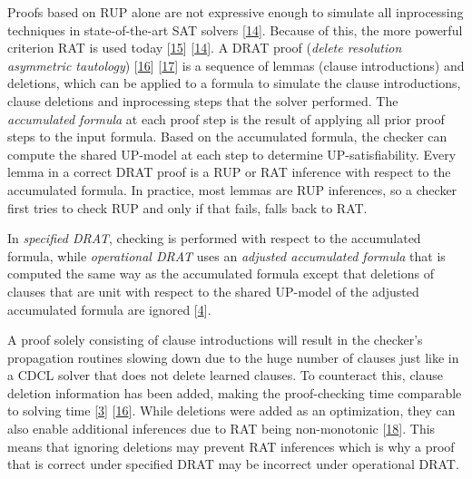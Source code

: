 \documentclass[
]{report}
\begin{document}
Proofs based on RUP alone are not expressive enough to simulate all
inprocessing techniques in state-of-the-art SAT solvers
{[}\protect\hyperlink{ref-DBLP:confux2fcadeux2fHeuleHW13}{14}{]}.
Because of this, the more powerful criterion RAT is used today
{[}\protect\hyperlink{ref-DBLP:journalsux2famaiux2fGelder12}{15}{]}
{[}\protect\hyperlink{ref-DBLP:confux2fcadeux2fHeuleHW13}{14}{]}. A DRAT
proof (\emph{delete resolution asymmetric tautology})
{[}\protect\hyperlink{ref-DBLP:confux2fsatux2fWetzlerHH14}{16}{]}
{[}\protect\hyperlink{ref-DBLP:journalsux2fcorrux2fHeule16}{17}{]} is a
sequence of lemmas (clause introductions) and deletions, which can be
applied to a formula to simulate the clause introductions, clause
deletions and inprocessing steps that the solver performed. The
\emph{accumulated formula} at each proof step is the result of applying
all prior proof steps to the input formula. Based on the accumulated
formula, the checker can compute the shared UP-model at each step to
determine UP-satisfiability. Every lemma in a correct DRAT proof is a
RUP or RAT inference with respect to the accumulated formula. In
practice, most lemmas are RUP inferences, so a checker first tries to
check RUP and only if that fails, falls back to RAT.

In \emph{specified DRAT}, checking is performed with respect to the
accumulated formula, while \emph{operational DRAT} uses an
\emph{adjusted accumulated formula} that is computed the same way as the
accumulated formula except that deletions of clauses that are unit with
respect to the shared UP-model of the adjusted accumulated formula are
ignored
{[}\protect\hyperlink{ref-DBLP:confux2fsatux2fRebola-PardoB18}{4}{]}.

A proof solely consisting of clause introductions will result in the
checker's propagation routines slowing down due to the huge number of
clauses just like in a CDCL solver that does not delete learned clauses.
To counteract this, clause deletion information has been added, making
the proof-checking time comparable to solving time
{[}\protect\hyperlink{ref-DBLP:journalsux2fstvrux2fHeuleHW14}{3}{]}
{[}\protect\hyperlink{ref-DBLP:confux2fsatux2fWetzlerHH14}{16}{]}. While
deletions were added as an optimization, they can also enable additional
inferences due to RAT being non-monotonic
{[}\protect\hyperlink{ref-DBLP:confux2flparux2fPhilippR17}{18}{]}. This
means that ignoring deletions may prevent RAT inferences which is why a
proof that is correct under specified DRAT may be incorrect under
operational DRAT.
\end{document}
